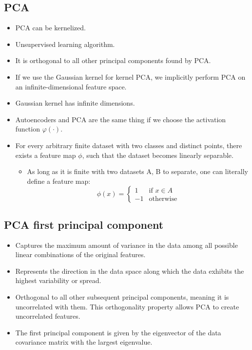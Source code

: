 \documentclass{article}
\begin{document}
\subsection{PCA}
\begin{itemize}
    \item PCA can be kernelized.
    \item Unsupervised learning algorithm.
    \item It is orthogonal to all other principal components found by PCA.
    \item If we use the Gaussian kernel for kernel PCA, we implicitly perform PCA on an infinite-dimensional feature space.
    \item Gaussian kernel has infinite dimensions.
    \item Autoencoders and PCA are the same thing if we choose the activation function $\varphi(\cdot)$.
    \item For every arbitrary finite dataset with two classes and distinct points, there exists a feature map $\phi$, such that the dataset becomes linearly separable.
    \begin{itemize}
        \item As long as it is finite with two datasets A, B to separate, one can literally define a feature map:
        \[
        \phi(x) = \begin{cases}
            1 & \text{if } x \in A \\
            -1 & \text{otherwise}
        \end{cases}
        \]
    \end{itemize}
\end{itemize}

\subsection{PCA first principal component}
\begin{itemize}
    \item Captures the maximum amount of variance in the data among all possible linear combinations of the original features.
    \item Represents the direction in the data space along which the data exhibits the highest variability or spread.
    \item Orthogonal to all other subsequent principal components, meaning it is uncorrelated with them. This orthogonality property allows PCA to create uncorrelated features.
    \item The first principal component is given by the eigenvector of the data covariance matrix with the largest eigenvalue.
\end{itemize}
\end{document}

